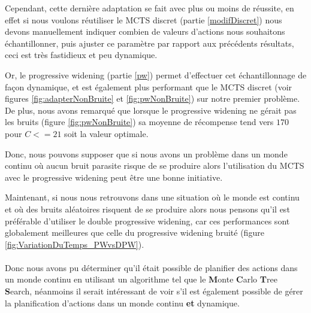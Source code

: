 \documentclass[pdftex,french, english]{article}	%
\begin{document}
Cependant, cette dernière adaptation se fait avec plus ou moins de réussite, en effet si nous voulons réutiliser le MCTS discret (partie \ref{modifDiscret}) nous devons manuellement indiquer combien de valeurs d'actions nous souhaitons échantillonner, puis ajuster ce paramètre par rapport aux précédents résultats, ceci est très fastidieux et peu dynamique.
	
    Or, le progressive widening (partie \ref{pw}) permet d'effectuer cet échantillonnage de façon dynamique, et est également plus performant que le MCTS discret (voir figures \ref{fig:adapterNonBruite} et \ref{fig:pwNonBruite}) sur notre premier problème.
    De plus, nous avons remarqué que lorsque le progressive widening ne gérait pas les bruits (figure \ref{fig:pwNonBruite}) sa moyenne de récompense tend vers $170$ pour $C <= 21$ soit la valeur optimale. 
    
    Donc, nous pouvons supposer que si nous avons un problème dans un monde continu où aucun bruit parasite risque de se produire alors l'utilisation du MCTS avec le progressive widening peut être une bonne initiative.
    
    
    Maintenant, si nous nous retrouvons dans une situation où le monde est continu et où des bruits aléatoires risquent de se produire alors nous pensons qu'il est préférable d'utiliser le double progressive widening, car ces performances sont globalement meilleures que celle du progressive widening bruité (figure \ref{fig:VariationDuTemps_PWvsDPW}).
    \\ \\
    Donc nous avons pu déterminer qu'il était possible de planifier des actions dans un monde continu en utilisant un algorithme tel que le \textbf{M}onte \textbf{C}arlo \textbf{T}ree \textbf{S}earch, néanmoins il serait intéressant de voir s'il est également possible de gérer la planification d'actions dans un monde continu \textbf{et} dynamique.




\newpage
{}


\end{document}
